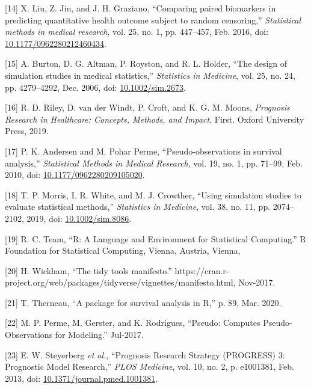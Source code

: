 \documentclass[12pt,PhD,twoside,openright]{muthesis}
\newenvironment{cslreferences}%
  {}%
  {\par}
\begin{document}
\begin{cslreferences}
\leavevmode\hypertarget{ref-liu_comparing_2016}{}%
{[}14{]} X. Liu, Z. Jin, and J. H. Graziano, ``Comparing paired biomarkers in predicting quantitative health outcome subject to random censoring,'' \emph{Statistical methods in medical research}, vol. 25, no. 1, pp. 447--457, Feb. 2016, doi: \href{https://doi.org/10.1177/0962280212460434}{10.1177/0962280212460434}.

\leavevmode\hypertarget{ref-burton_design_2006}{}%
{[}15{]} A. Burton, D. G. Altman, P. Royston, and R. L. Holder, ``The design of simulation studies in medical statistics,'' \emph{Statistics in Medicine}, vol. 25, no. 24, pp. 4279--4292, Dec. 2006, doi: \href{https://doi.org/10.1002/sim.2673}{10.1002/sim.2673}.

\leavevmode\hypertarget{ref-riley_prognosis_2019}{}%
{[}16{]} R. D. Riley, D. van der Windt, P. Croft, and K. G. M. Moons, \emph{Prognosis Research in Healthcare: Concepts, Methods, and Impact}, First. Oxford University Press, 2019.

\leavevmode\hypertarget{ref-andersen_pseudo-observations_2010}{}%
{[}17{]} P. K. Andersen and M. Pohar Perme, ``Pseudo-observations in survival analysis,'' \emph{Statistical Methods in Medical Research}, vol. 19, no. 1, pp. 71--99, Feb. 2010, doi: \href{https://doi.org/10.1177/0962280209105020}{10.1177/0962280209105020}.

\leavevmode\hypertarget{ref-morris_using_2019}{}%
{[}18{]} T. P. Morris, I. R. White, and M. J. Crowther, ``Using simulation studies to evaluate statistical methods,'' \emph{Statistics in Medicine}, vol. 38, no. 11, pp. 2074--2102, 2019, doi: \href{https://doi.org/10.1002/sim.8086}{10.1002/sim.8086}.

\leavevmode\hypertarget{ref-r_core_team_r_nodate}{}%
{[}19{]} R. C. Team, ``R: A Language and Environment for Statistical Computing.'' R Foundation for Statistical Computing, Vienna, Austria, Vienna,

\leavevmode\hypertarget{ref-wickham_tidy_2017}{}%
{[}20{]} H. Wickham, ``The tidy tools manifesto.'' https://cran.r-project.org/web/packages/tidyverse/vignettes/manifesto.html, Nov-2017.

\leavevmode\hypertarget{ref-therneau_package_2020}{}%
{[}21{]} T. Therneau, ``A package for survival analysis in R,'' p. 89, Mar. 2020.

\leavevmode\hypertarget{ref-perme_pseudo_2017}{}%
{[}22{]} M. P. Perme, M. Gerster, and K. Rodrigues, ``Pseudo: Computes Pseudo-Observations for Modeling.'' Jul-2017.

\leavevmode\hypertarget{ref-steyerberg_prognosis_2013}{}%
{[}23{]} E. W. Steyerberg \emph{et al.}, ``Prognosis Research Strategy (PROGRESS) 3: Prognostic Model Research,'' \emph{PLOS Medicine}, vol. 10, no. 2, p. e1001381, Feb. 2013, doi: \href{https://doi.org/10.1371/journal.pmed.1001381}{10.1371/journal.pmed.1001381}.


\end{cslreferences}
\end{document}
